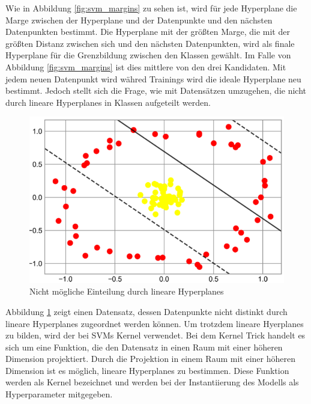 Wie in Abbildung \ref{fig:svm_margins} zu sehen ist, wird für jede Hyperplane die Marge zwischen der Hyperplane und der Datenpunkte und den nächsten Datenpunkten bestimmt.
Die Hyperplane mit der größten Marge, die mit der größten Distanz zwischen sich und den nächsten Datenpunkten, wird als finale Hyperplane für die Grenzbildung zwischen den Klassen gewählt. Im Falle von Abbildung \ref{fig:svm_margins}
ist dies mittlere von den drei Kandidaten. Mit jedem neuen Datenpunkt wird währed Trainings wird die ideale Hyperplane neu bestimmt.
Jedoch stellt sich die Frage, wie mit Datensätzen umzugehen, die nicht durch lineare Hyperplanes in Klassen aufgeteilt werden.

\pagebreak

\begin{figure}[h]
    \centering
    \includegraphics[scale=0.5]{figures/svm_non_linear.png}
    \caption{Nicht mögliche Einteilung durch lineare Hyperplanes}
    \label{fig:svm_non_linear}
\end{figure}


Abbildung \ref{fig:svm_non_linear} zeigt einen Datensatz, dessen Datenpunkte nicht distinkt durch lineare Hyperplanes zugeordnet werden können. Um trotzdem lineare Hyerplanes zu bilden,
wird der bei SVMs Kernel verwendet. Bei dem Kernel Trick handelt es sich um eine Funktion, die den Datensatz in einen Raum mit einer höheren Dimension projektiert.
Durch die Projektion in einem Raum mit einer höheren Dimension ist es möglich, lineare Hyperplanes zu bestimmen.
Diese Funktion werden als Kernel bezeichnet und werden bei der Instantiierung des Modells als Hyperparameter mitgegeben.

